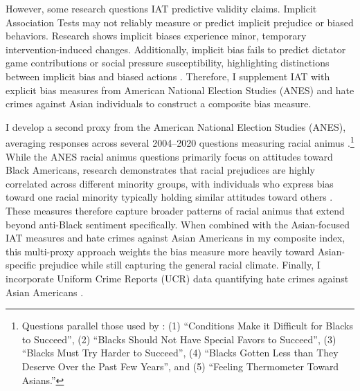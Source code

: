 \documentclass[12pt,english]{article}
\begin{document}
However, some research questions IAT predictive validity claims. Implicit Association Tests may not reliably measure or predict implicit prejudice or biased behaviors. Research shows implicit biases experience minor, temporary intervention-induced changes. Additionally, implicit bias fails to predict dictator game contributions or social pressure susceptibility, highlighting distinctions between implicit bias and biased actions \autocite{arkesAttributionsImplicitPrejudice2004,forscherMetaanalysisProceduresChange2019,leeDoesImplicitBias2018}. Therefore, I supplement IAT with explicit bias measures from American National Election Studies (ANES) and hate crimes against Asian individuals to construct a composite bias measure.

I develop a second proxy from the American National Election Studies (ANES), averaging responses across several 2004--2020 questions measuring racial animus \autocite{anes2021}.\footnote{Questions parallel those used by \textcite{charlesPrejudiceWagesEmpirical2008}: (1) ``Conditions Make it Difficult for Blacks to Succeed'', (2) ``Blacks Should Not Have Special Favors to Succeed'', (3) ``Blacks Must Try Harder to Succeed'', (4) ``Blacks Gotten Less than They Deserve Over the Past Few Years'', and (5) ``Feeling Thermometer Toward Asians.''} While the ANES racial animus questions primarily focus on attitudes toward Black Americans, research demonstrates that racial prejudices are highly correlated across different minority groups, with individuals who express bias toward one racial minority typically holding similar attitudes toward others \autocite{almasalkhi2023links, mora2020antiblackness}. These measures therefore capture broader patterns of racial animus that extend beyond anti-Black sentiment specifically. When combined with the Asian-focused IAT measures and hate crimes against Asian Americans in my composite index, this multi-proxy approach weights the bias measure more heavily toward Asian-specific prejudice while still capturing the general racial climate. Finally, I incorporate Uniform Crime Reports (UCR) data quantifying hate crimes against Asian Americans \autocite{ucrbook}.
\end{document}
